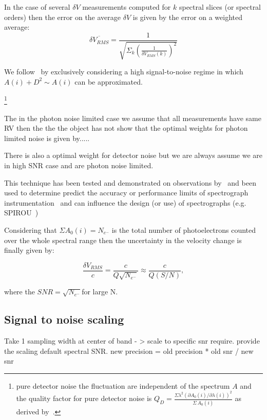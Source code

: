In the case of several \(\delta V\) measurements computed for \(k\) spectral slices (or spectral orders) then the error on the average \(\delta V\) is given by the error on a weighted average:
\begin{equation}
\overline{\delta {V}_{RMS}} = \frac{1}{\sqrt{\Sigma_k{(\frac{1}{\delta V_{RMS}(k)})^2}}}
\end{equation}


We follow~\cite{figueira_radial_2016} by exclusively considering a high signal-to-noise regime in which $A(i) + D^2 \sim A(i)$ can be approximated.


\footnote{ pure detector noise the fluctuation are independent of the spectrum \(A\) and the quality factor for pure detector noise is \(Q_D = \frac{\Sigma{\lambda^2 {(\partial A_0(i)/\partial \lambda(i))}^{2}}}{\Sigma{\, A_0(i)}}\) as derived by~\cite{Connes1985}. }

The in the photon noise limited case we assume that all measurements have same RV then the the the object has not
\citet{Connes1985} show that the optimal weights for photon limited noise is given by.....

There is also a optimal weight for detector noise but we are always assume we are in high SNR case and are photon noise limited.


This technique has been tested and demonstrated on observations by~\citet{connes_demonstration_1996} and been used to determine predict the accuracy or performance limits of spectrograph instrumentation~\citet{Connes1985,bouchy_fundamental_2001} and can influence the design (or use) of spectrographs
 (e.g. SPIROU~\citep{artigau_spirou_2014,figueira_radial_2016})


Considering that \(\Sigma{A_0(i)} = N_{e^-} \) is the total number of photoelectrons counted over the whole spectral range then the uncertainty in the velocity change is finally given by:

\begin{equation}
\frac{\delta V_{RMS}}{c} = \frac{c}{Q \sqrt{N_{e^-}}} \approx \frac{c}{Q (S/N)},
\end{equation}

where the \(SNR=\sqrt{N_{e^-}} \)for large N. 




\subsection {Signal to noise scaling}
Take 1 sampling width at center of band - > scale to specific snr require.
provide the scaling default spectral SNR.
new precision = old precision * old snr / new snr

